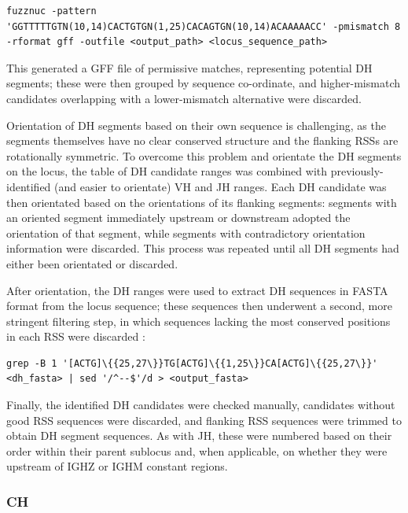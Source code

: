 \begin{lstlisting}
fuzznuc -pattern 'GGTTTTTGTN(10,14)CACTGTGN(1,25)CACAGTGN(10,14)ACAAAAACC' -pmismatch 8 -rformat gff -outfile <output_path> <locus_sequence_path>
\end{lstlisting}

This generated a GFF file \citep{stein2010generic} of permissive matches, representing potential DH segments; these were then grouped by sequence co-ordinate, and higher-mismatch candidates overlapping with a lower-mismatch alternative were discarded.

Orientation of DH segments based on their own sequence is challenging, as the segments themselves have no clear conserved structure and the flanking RSSs are rotationally symmetric. To overcome this problem and orientate the DH segments on the locus, the table of DH candidate ranges was combined with previously-identified (and easier to orientate) VH and JH ranges. Each DH candidate was then orientated based on the orientations of its flanking segments: segments with an oriented segment immediately upstream or downstream adopted the orientation of that segment, while segments with contradictory orientation information were discarded. This process was repeated until all DH segments had either been orientated or discarded.

After orientation, the DH ranges were used to extract DH sequences in FASTA format from the locus sequence; these sequences then underwent a second, more stringent filtering step, in which sequences lacking the most conserved positions in each RSS were discarded \citep{grep}:

\begin{lstlisting}
grep -B 1 '[ACTG]\{{25,27\}}TG[ACTG]\{{1,25\}}CA[ACTG]\{{25,27\}}' <dh_fasta> | sed '/^--$'/d > <output_fasta>
\end{lstlisting}

Finally, the identified DH candidates were checked manually, candidates without good RSS sequences were discarded, and flanking RSS sequences were trimmed to obtain DH segment sequences. As with JH, these were numbered based on their order within their parent sublocus and, when applicable, on whether they were upstream of IGHZ or IGHM constant regions.

\subsubsection{CH}
\label{sec:locus_char_ch}

